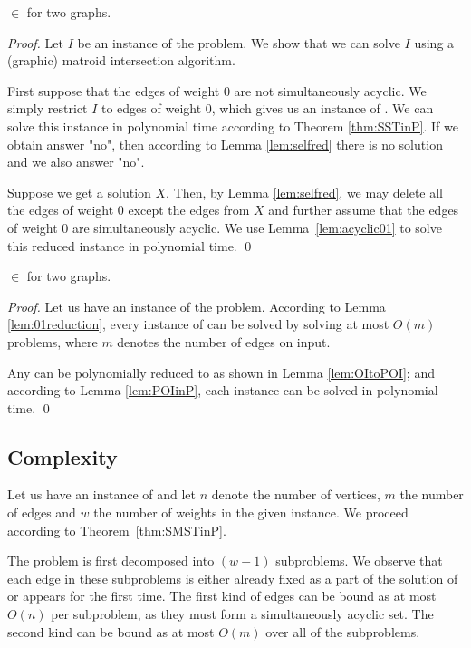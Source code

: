 \begin{lemma}\label{lem:POIinP}
\POISMST $\in$ \PP for two graphs.
\end{lemma}
\begin{proof}
Let $I$ be an instance of the \POISMST problem. We show that we can solve $I$ using a (graphic) matroid intersection algorithm. 

First suppose that the edges of weight 0 are not simultaneously acyclic. We simply restrict $I$ to edges of weight 0, which gives us an instance of \SST. We can solve this instance in polynomial time according to Theorem \ref{thm:SSTinP}. If we obtain answer "no", then according to Lemma \ref{lem:selfred} there is no solution and we also answer "no". 

Suppose we get a solution $X$. Then, by Lemma \ref{lem:selfred}, we may delete all the edges of weight 0 except the edges from $X$ and further assume that the edges of weight 0 are simultaneously acyclic. We use Lemma~\ref{lem:acyclic01} to solve this reduced instance in polynomial time. \qed
\end{proof}

\begin{theorem}\label{thm:SMSTinP}
\SMST $\in$ \PP for two graphs.
\end{theorem}
\begin{proof}
Let us have an instance of the \SMST problem. According to Lemma \ref{lem:01reduction}, every instance of \SMST can be solved by solving at most $O(m)$ \OISMST problems, where $m$ denotes the number of edges on input. 

Any \OISMST can be polynomially reduced to \POISMST as shown in Lemma \ref{lem:OItoPOI}; and according to Lemma \ref{lem:POIinP}, each \POISMST instance can be solved in polynomial time. \qed
\end{proof}

\subsection{Complexity}

Let us have an instance of \SMST and let $n$ denote the number of vertices, $m$ the number of edges and $w$ the number of weights in the given instance. We proceed according to Theorem~\ref{thm:SMSTinP}. 

The \SMST problem is first decomposed into $(w-1)$ \OISMST subproblems. We observe that each edge in these subproblems is either already fixed as a part of the solution of \SMST or appears for the first time. The first kind of edges can be bound as at most $O(n)$ per \OISMST subproblem, as they must form a simultaneously acyclic set. The second kind can be bound as at most $O(m)$ over all of the \OISMST subproblems. 

